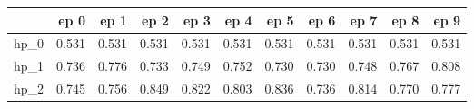 \begin{tabular}{lrrrrrrrrrr}
\toprule
{} &   ep 0 &   ep 1 &   ep 2 &   ep 3 &   ep 4 &   ep 5 &   ep 6 &   ep 7 &   ep 8 &   ep 9 \\
\midrule
hp\_0 &  0.531 &  0.531 &  0.531 &  0.531 &  0.531 &  0.531 &  0.531 &  0.531 &  0.531 &  0.531 \\
hp\_1 &  0.736 &  0.776 &  0.733 &  0.749 &  0.752 &  0.730 &  0.730 &  0.748 &  0.767 &  0.808 \\
hp\_2 &  0.745 &  0.756 &  0.849 &  0.822 &  0.803 &  0.836 &  0.736 &  0.814 &  0.770 &  0.777 \\
\bottomrule
\end{tabular}
